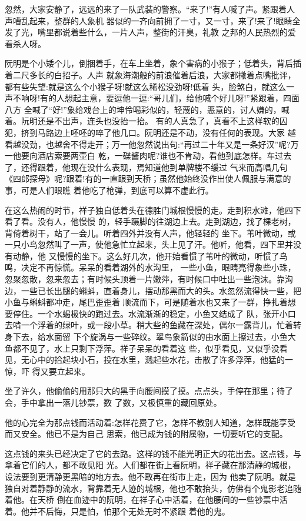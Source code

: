 \documentclass[11pt,a4paper,onecolumn]{article}
\begin{document}
忽然，大家安静了，远远的来了一队武装的警察。``来了!''有人喊了声。紧跟着人声嘈乱起来，整群的人象机
器似的一齐向前拥了一寸，又一寸，来了!来了!眼睛全发了光，嘴里都说着些什么，一片人声，整街的汗臭，礼教
之邦的人民热烈的爱看杀人呀。

阮明是个小矮个儿，倒捆着手，在车上坐着，象个害病的小猴子；低着头，背后插着二尺多长的白招子。人声
就象海潮般的前浪催着后浪，大家都撇着点嘴批评，都有些失望:就是这么个小猴子呀!就这么稀松没劲呀!低着
头，脸煞白，就这么一声不响呀!有的人想起主意，要逗他一逗:``哥儿们，给他喊个好儿呀!''紧跟着，四面八方
全喊了``好!''象给戏台上的坤伶喝彩似的，轻蔑的，恶意的，讨人嫌的，喊着。阮明还是不出声，连头也没抬一抬。
有的人真急了，真看不上这样软的囚犯，挤到马路边上呸呸的啐了他几口。阮明还是不动，没有任何的表现。大家
越看越没劲，也越舍不得走开；万一他忽然说出句:``再过二十年又是一条好汉''呢?万一他要向酒店索要两壶白
乾，一碟酱肉呢?谁也不肯动，看他到底怎样。车过去了，还得跟着，他现在没什么表现，焉知道他到单牌楼不缓过
气来而高唱几句《四郎探母》呢?跟着!有的一直跟到天桥；虽然他始终没作出使人佩服与满意的事，可是人们眼瞧
着他吃了枪弹，到底可以算不虚此行。

在这么热闹的时节，祥子独自低着头在德胜门城根慢慢的走。走到积水滩，他四下看了看。没有人，他慢慢
的，轻手蹑脚的往湖边上去。走到湖边，找了棵老树，背倚着树干，站了一会儿。听着四外并没有人声，他轻轻的
坐下。苇叶微动，或一只小鸟忽然叫了一声，使他急忙立起来，头上见了汗。他听，他看，四下里并没有动静，他
又慢慢的坐下。这么好几次，他开始看惯了苇叶的微动，听惯了鸟鸣，决定不再惊慌。呆呆的看着湖外的水沟里，
一些小鱼，眼睛亮得象些小珠，忽聚忽散，忽来忽去；有时候头顶着一片嫩萍，有时候口中吐出一些泡沫。靠沟
边，一些已长出腿的蝌蚪，直着身儿，摆动那黑而大的头。水忽然流得快一些，把小鱼与蝌蚪都冲走，尾巴歪歪着
顺流而下，可是随着水也又来了一群，挣扎着想要停住。一个水蝎极快的跑过去。水流渐渐的稳定，小鱼又结成了
队，张开小口去啃一个浮着的绿叶，或一段小草。稍大些的鱼藏在深处，偶尔一露背儿，忙着转身下去，给水面留
下个旋涡与一些碎纹。翠鸟象箭似的由水面上擦过去，小鱼大鱼都不见了，水上只剩下浮萍。祥子呆呆的看着这
些，似乎看见，又似乎没看见，无心中的拾起块小石，投在水里，溅起些水花，击散了许多浮萍，他猛的一惊，吓
得又要立起来。

坐了许久，他偷偷的用那只大的黑手向腰间摸了摸。点点头，手停在那里；待了会，手中拿出一落儿钞票，数
了数，又极慎重的藏回原处。

他的心完全为那点钱而活动着:怎样花费了它，怎样不教别人知道，怎样既能享受而又安全。他已不是为自己
思索，他已成为钱的附属物，一切要听它的支配。

这点钱的来头已经决定了它的去路。这样的钱不能光明正大的花出去。这点钱，与拿着它们的人，都不敢见阳
光。人们都在街上看阮明，祥子藏在那清静的城根，设法要到更清静更黑暗的地方去。他不敢再在街市上走，因为
他卖了阮明。就是独自对着静静的流水，背靠着无人迹的城根，他也不敢抬头，仿佛有个鬼影老追随着他。在天桥
倒在血迹中的阮明，在祥子心中活着，在他腰间的一些钞票中活着。他并不后悔，只是怕，怕那个无处无时不紧跟
着他的鬼。
\end{document}
